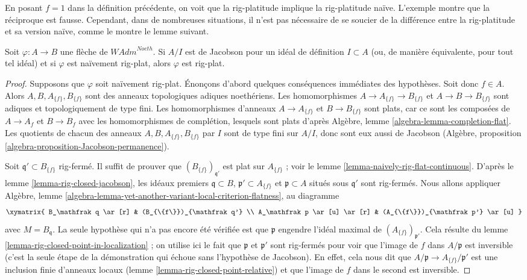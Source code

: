 \noindent
En posant $f = 1$ dans la définition précédente, on voit que la rig-platitude
implique la rig-platitude naïve. L'exemple montre que la réciproque est fausse.
Cependant, dans de nombreuses situations, il n'est pas nécessaire de se soucier
de la différence entre la rig-platitude et sa version naïve, comme le montre le lemme suivant.

\begin{lemma}
\label{lemma-rig-flat-naive}
Soit $\varphi : A \to B$ une flèche de $\textit{WAdm}^{Noeth}$.
Si $A/I$ est de Jacobson pour un idéal de définition $I \subset A$
(ou, de manière équivalente, pour tout tel idéal) et si $\varphi$ est
naïvement rig-plat, alors $\varphi$ est rig-plat.
\end{lemma}

\begin{proof}
Supposons que $\varphi$ soit naïvement rig-plat. Énonçons d'abord quelques
conséquences immédiates des hypothèses. Soit donc $f \in A$.
Alors $A, B, A_{\{f\}}, B_{\{f\}}$
sont des anneaux topologiques adiques noethériens. Les homomorphismes
$A \to A_{\{f\}} \to B_{\{f\}}$ et $A \to B \to B_{\{f\}}$
sont adiques et topologiquement de type fini.
Les homomorphismes d'anneaux $A \to A_{\{f\}}$ et $B \to B_{\{f\}}$
sont plats, car ce sont les composées de $A \to A_f$ et $B \to B_f$
avec les homomorphismes de complétion, lesquels sont plats d'après
Algèbre, lemme \ref{algebra-lemma-completion-flat}.
Les quotients de chacun des anneaux
$A, B, A_{\{f\}}, B_{\{f\}}$ par $I$ sont de type fini
sur $A/I$, donc sont eux aussi de Jacobson
(Algèbre, proposition \ref{algebra-proposition-Jacobson-permanence}).

\medskip\noindent
Soit $\mathfrak q' \subset B_{\{f\}}$ rig-fermé.
Il suffit de prouver que $(B_{\{f\}})_{\mathfrak q'}$
est plat sur $A_{\{f\}}$ ; voir le lemme \ref{lemma-naively-rig-flat-continuous}.
D'après le lemme \ref{lemma-rig-closed-jacobson}, les idéaux premiers
$\mathfrak q \subset B$, $\mathfrak p' \subset A_{\{f\}}$
et $\mathfrak p \subset A$ situés sous $\mathfrak q'$ sont rig-fermés.
Nous allons appliquer
Algèbre, lemme \ref{algebra-lemma-yet-another-variant-local-criterion-flatness},
au diagramme
$$
\xymatrix{
B_\mathfrak q \ar[r] &
(B_{\{f\}})_{\mathfrak q'} \\
A_\mathfrak p \ar[u] \ar[r] &
(A_{\{f\}})_{\mathfrak p'} \ar[u]
}
$$
avec $M = B_\mathfrak q$.
La seule hypothèse qui n'a pas encore été vérifiée est que
$\mathfrak p$ engendre l'idéal maximal de
$(A_{\{f\}})_{\mathfrak p'}$. Cela résulte du
lemme \ref{lemma-rig-closed-point-in-localization} ;
on utilise ici le fait que $\mathfrak p$ et $\mathfrak p'$ sont rig-fermés
pour voir que l'image de $f$ dans $A/\mathfrak p$ est inversible
(c'est la seule étape de la démonstration qui échoue sans
l'hypothèse de Jacobson). En effet,
cela nous dit que $A/\mathfrak p \to A_{\{f\}}/\mathfrak p'$
est une inclusion finie d'anneaux locaux
(lemme \ref{lemma-rig-closed-point-relative})
et que l'image de $f$ dans le second est inversible.
\end{proof}


